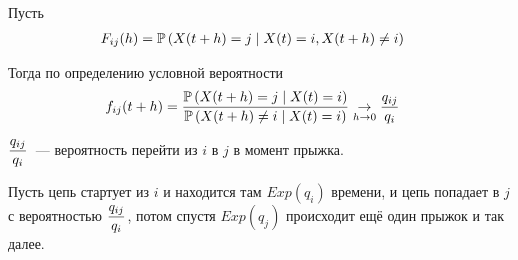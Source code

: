\begin{Des}
    Пусть
    \begin{align*}
      & F_{ij}(h) = \mathbb{P}\left( X(t+h) = j\mid X(t) = i, X(t+h) \neq i \right)
    \end{align*}
\end{Des}
Тогда по определению условной вероятности
\begin{align*}
  & f_{ij}(t+h) = \frac{\mathbb{P}\left( X(t+h) = j\mid X(t) = i \right)}{\mathbb{P}\left( X(t+h) \neq i \mid X(t) = i \right)}\underset{h \to 0}\rightarrow \frac{q_{ij}}{q_i}
\end{align*}
\begin{Def}
    $\displaystyle \frac{q_{ij}}{q_i}$~--- вероятность перейти из $i$ в $j$ в момент прыжка.
\end{Def}
Пусть цепь стартует из $i$ и находится там $Exp(q_i)$ времени, и цепь попадает в
$j$ с вероятностью $\displaystyle \frac{q_{ij}}{q_i}$, потом спустя $Exp(q_j)$ происходит
ещё один прыжок и так далее.
